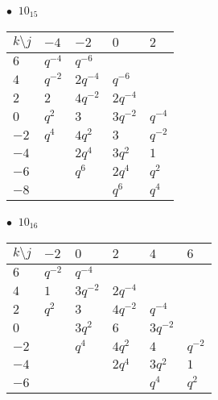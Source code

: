 %
\begin{minipage}{\linewidth}
$\bullet\ $ $10_{15}$ \vspace{0.5em} \\
\begin{tabular}{l|llll}
$k \setminus j$ & $-4$ & $-2$ & $0$ & $2$ \\
\hline
$6$ & $q^{-4}$ & $q^{-6}$ &  &  \\
$4$ & $q^{-2}$ & $2q^{-4}$ & $q^{-6}$ &  \\
$2$ & $2$ & $4q^{-2}$ & $2q^{-4}$ &  \\
$0$ & $q^{2}$ & $3$ & $3q^{-2}$ & $q^{-4}$ \\
$-2$ & $q^{4}$ & $4q^{2}$ & $3$ & $q^{-2}$ \\
$-4$ &  & $2q^{4}$ & $3q^{2}$ & $1$ \\
$-6$ &  & $q^{6}$ & $2q^{4}$ & $q^{2}$ \\
$-8$ &  &  & $q^{6}$ & $q^{4}$ \\
\end{tabular}
\vspace{2em}
\end{minipage}
%
\begin{minipage}{\linewidth}
$\bullet\ $ $10_{16}$ \vspace{0.5em} \\
\begin{tabular}{l|lllll}
$k \setminus j$ & $-2$ & $0$ & $2$ & $4$ & $6$ \\
\hline
$6$ & $q^{-2}$ & $q^{-4}$ &  &  &  \\
$4$ & $1$ & $3q^{-2}$ & $2q^{-4}$ &  &  \\
$2$ & $q^{2}$ & $3$ & $4q^{-2}$ & $q^{-4}$ &  \\
$0$ &  & $3q^{2}$ & $6$ & $3q^{-2}$ &  \\
$-2$ &  & $q^{4}$ & $4q^{2}$ & $4$ & $q^{-2}$ \\
$-4$ &  &  & $2q^{4}$ & $3q^{2}$ & $1$ \\
$-6$ &  &  &  & $q^{4}$ & $q^{2}$ \\
\end{tabular}
\vspace{2em}
\end{minipage}
%
